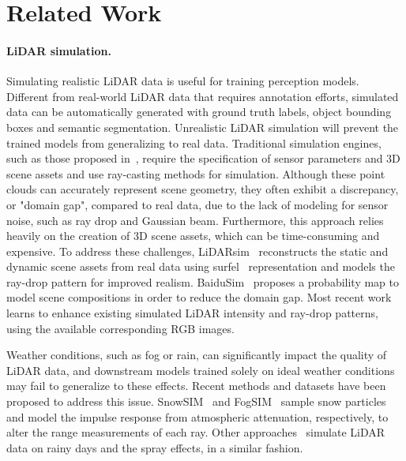 \section{Related Work}
\label{sec:relwork}
\paragraph{LiDAR simulation.}
Simulating realistic LiDAR data is useful for training perception models. Different from real-world LiDAR data that requires annotation efforts, simulated data can be automatically generated with ground truth labels, \eg object bounding boxes and semantic segmentation. Unrealistic LiDAR simulation will prevent the trained models from generalizing to real data.   %
Traditional simulation engines, such as those proposed in~\cite{dosovitskiy2017carla,koenig2004design}, require the specification of sensor parameters and 3D scene assets and use ray-casting methods for simulation. 
 Although these point clouds can accurately represent scene geometry, they often exhibit a discrepancy, or "domain gap", compared to real data, due to the lack of modeling for sensor noise, such as ray drop and Gaussian beam. 
Furthermore, this approach relies heavily on the creation of 3D scene assets, which can be time-consuming and expensive. 
To address these challenges, LiDARsim~\cite{manivasagam2020lidarsim} reconstructs the static and dynamic scene assets from real data using surfel~\cite{pfister2000surfels} representation and models the ray-drop pattern for improved realism. BaiduSim~\cite{baidusim} proposes a probability map to model scene compositions in order to reduce the domain gap. Most recent work~\cite{guillard2022learning} learns to enhance existing simulated LiDAR intensity and ray-drop patterns, using the available corresponding RGB images. 

Weather conditions, such as fog or rain, can significantly impact the quality of LiDAR data, and downstream models trained solely on ideal weather conditions may fail to generalize to these effects. Recent methods and datasets \cite{hahner2021fog,hahner2022lidar,kilic2021lidar,bijelic2020seeing} have been proposed to address this issue. %
  SnowSIM~\cite{hahner2022lidar} and FogSIM~\cite{hahner2021fog} sample snow particles and model the impulse response from atmospheric attenuation, respectively, to alter the range measurements of each ray.
 Other approaches~\cite{shih2022reconstruction,kilic2021lidar, kurup2021dsor} simulate LiDAR data on rainy days and the spray effects, in a similar fashion.


